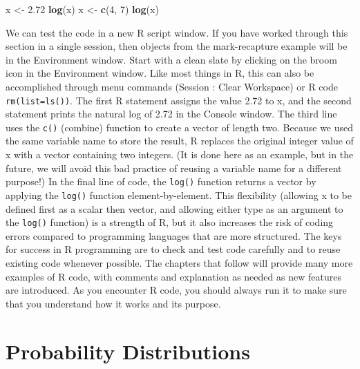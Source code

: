 \documentclass[
]{krantz}
\makeatletter
\newenvironment{Shaded}{\begin{snugshade}}{\end{snugshade}}
\newcommand{\DecValTok}[1]{\textcolor[rgb]{0.06,0.06,0.06}{#1}}
\newcommand{\FloatTok}[1]{\textcolor[rgb]{0.06,0.06,0.06}{#1}}
\newcommand{\FunctionTok}[1]{\textcolor[rgb]{0.27,0.27,0.27}{\textbf{#1}}}
\newcommand{\NormalTok}[1]{#1}
\newcommand{\OtherTok}[1]{\textcolor[rgb]{0.37,0.37,0.37}{#1}}
\newenvironment{kframe}{%
\medskip{}
\setlength{\fboxsep}{.8em}
 \def\at@end@of@kframe{}%
 \ifinner\ifhmode%
  \def\at@end@of@kframe{\end{minipage}}%
  \begin{minipage}{\columnwidth}%
 \fi\fi%
 \def\FrameCommand##1{\hskip\@totalleftmargin \hskip-\fboxsep
 \colorbox{shadecolor}{##1}\hskip-\fboxsep
     \hskip-\linewidth \hskip-\@totalleftmargin \hskip\columnwidth}%
 \MakeFramed {\advance\hsize-\width
   \@totalleftmargin\z@ \linewidth\hsize
   \@setminipage}}%
 {\par\unskip\endMakeFramed%
 \at@end@of@kframe}
\renewenvironment{Shaded}{\begin{kframe}}{\end{kframe}}
\makeatother
\begin{document}
\begin{Shaded}
\begin{Highlighting}[]
\NormalTok{x }\OtherTok{\textless{}{-}} \FloatTok{2.72}
\FunctionTok{log}\NormalTok{(x)}
\NormalTok{x }\OtherTok{\textless{}{-}} \FunctionTok{c}\NormalTok{(}\DecValTok{4}\NormalTok{, }\DecValTok{7}\NormalTok{)}
\FunctionTok{log}\NormalTok{(x)}
\end{Highlighting}
\end{Shaded}

We can test the code in a new R script window. If you have worked through this section in a single session, then objects from the mark-recapture example will be in the Environment window. Start with a clean slate by clicking on the broom icon in the Environment window. Like most things in R, this can also be accomplished through menu commands (Session : Clear Workspace) or R code \texttt{rm(list=ls())}. The first R statement assigns the value 2.72 to x, and the second statement prints the natural log of 2.72 in the Console window. The third line uses the \texttt{c()} (combine) function to create a vector of length two. Because we used the same variable name to store the result, R replaces the original integer value of x with a vector containing two integers. (It is done here as an example, but in the future, we will avoid this bad practice of reusing a variable name for a different purpose!) In the final line of code, the \texttt{log()} function returns a vector by applying the \texttt{log()} function element-by-element. This flexibility (allowing x to be defined first as a scalar then vector, and allowing either type as an argument to the \texttt{log()} function) is a strength of R, but it also increases the risk of coding errors compared to programming languages that are more structured. The keys for success in R programming are to check and test code carefully and to reuse existing code whenever possible. The chapters that follow will provide many more examples of R code, with comments and explanation as needed as new features are introduced. As you encounter R code, you should always run it to make sure that you understand how it works and its purpose.

\mainmatter

\hypertarget{Distributions}{%
\chapter{Probability Distributions}\label{Distributions}}
\end{document}
